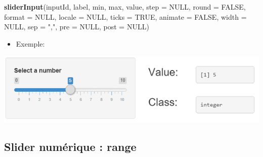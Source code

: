 \documentclass[]{article}
\newenvironment{Shaded}{\begin{snugshade}}{\end{snugshade}}
\newcommand{\KeywordTok}[1]{\textcolor[rgb]{0.13,0.29,0.53}{\textbf{#1}}}
\newcommand{\DataTypeTok}[1]{\textcolor[rgb]{0.13,0.29,0.53}{#1}}
\newcommand{\DecValTok}[1]{\textcolor[rgb]{0.00,0.00,0.81}{#1}}
\newcommand{\StringTok}[1]{\textcolor[rgb]{0.31,0.60,0.02}{#1}}
\newcommand{\CommentTok}[1]{\textcolor[rgb]{0.56,0.35,0.01}{\textit{#1}}}
\newcommand{\OtherTok}[1]{\textcolor[rgb]{0.56,0.35,0.01}{#1}}
\newcommand{\NormalTok}[1]{#1}
\providecommand{\tightlist}{%
  \setlength{\itemsep}{0pt}\setlength{\parskip}{0pt}}
\begin{document}
\begin{Shaded}
\begin{Highlighting}[]
\KeywordTok{sliderInput}\NormalTok{(inputId, label, min, max, value, }\DataTypeTok{step =} \OtherTok{NULL}\NormalTok{, }\DataTypeTok{round =} \OtherTok{FALSE}\NormalTok{,}
            \DataTypeTok{format =} \OtherTok{NULL}\NormalTok{, }\DataTypeTok{locale =} \OtherTok{NULL}\NormalTok{, }\DataTypeTok{ticks =} \OtherTok{TRUE}\NormalTok{, }\DataTypeTok{animate =} \OtherTok{FALSE}\NormalTok{,}
            \DataTypeTok{width =} \OtherTok{NULL}\NormalTok{, }\DataTypeTok{sep =} \StringTok{","}\NormalTok{, }\DataTypeTok{pre =} \OtherTok{NULL}\NormalTok{, }\DataTypeTok{post =} \OtherTok{NULL}\NormalTok{)}
\end{Highlighting}
\end{Shaded}

\begin{itemize}
\tightlist
\item
  Exemple:
\end{itemize}

\begin{Shaded}
\end{Shaded}

\includegraphics{img/slider.png}

\subsection{Slider numérique : range}\label{slider-numerique-range}
\end{document}
